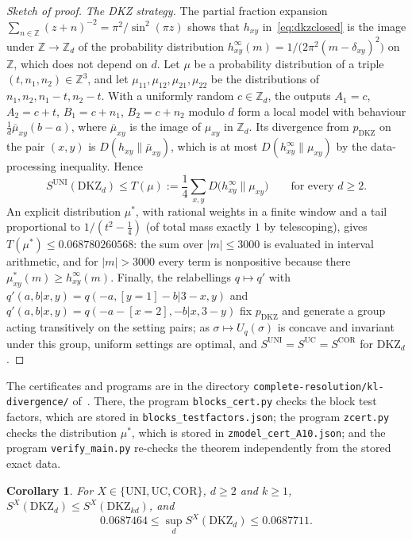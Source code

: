 \documentclass[11pt]{amsart}
\newtheorem{corollary}[theorem]{Corollary}
\theoremstyle{definition}
\theoremstyle{remark}
\numberwithin{equation}{section}
\newcommand{\Z}{\mathbb{Z}}
\newcommand{\DKZ}{\mathrm{DKZ}}
\begin{document}
\begin{proof}[Sketch of proof]
\emph{The DKZ strategy.} The partial fraction expansion $\sum_{n\in\Z}(z+n)^{-2}=\pi^2/\sin^2(\pi z)$ shows that $h_{xy}$
in~\eqref{eq:dkzclosed} is the image under $\Z\to\Z_d$ of the probability distribution
$h^\infty_{xy}(m)=1/\bigl(2\pi^2(m-\delta_{xy})^2\bigr)$ on $\Z$, which does not depend on $d$. Let $\mu$ be a probability
distribution of a triple $(t,n_1,n_2)\in\Z^3$, and let $\mu_{11},\mu_{12},\mu_{21},\mu_{22}$ be the distributions of
$n_1,n_2,n_1-t,n_2-t$. With a uniformly random $c\in\Z_d$, the outputs $A_1=c$, $A_2=c+t$, $B_1=c+n_1$, $B_2=c+n_2$
modulo $d$ form a local model with behaviour $\frac1d\bar\mu_{xy}(b-a)$, where $\bar\mu_{xy}$ is the image of
$\mu_{xy}$ in $\Z_d$. Its divergence from $p_{\DKZ}$ on the pair $(x,y)$ is $D(h_{xy}\|\bar\mu_{xy})$, which is at most
$D(h^\infty_{xy}\|\mu_{xy})$ by the data-processing inequality. Hence
\[
S^{\mathrm{UNI}}(\DKZ_d)\le T(\mu):=\frac14\sum_{x,y}D\bigl(h^\infty_{xy}\big\|\mu_{xy}\bigr)\qquad\text{for every }d\ge2.
\]
An explicit distribution $\mu^*$, with rational weights in a finite window and a tail proportional to $1/(t^2-\frac14)$
(of total mass exactly $1$ by telescoping), gives $T(\mu^*)\le0.068780260568$: the sum over $|m|\le3000$ is evaluated in
interval arithmetic, and for $|m|>3000$ every term is nonpositive because there $\mu^*_{xy}(m)\ge h^\infty_{xy}(m)$.
Finally, the relabellings $q\mapsto q'$ with $q'(a,b|x,y)=q(-a,[y=1]-b|3-x,y)$ and
$q'(a,b|x,y)=q(-a-[x=2],-b|x,3-y)$ fix $p_{\DKZ}$ and generate a group acting transitively on the setting pairs; as
$\sigma\mapsto U_q(\sigma)$ is concave and invariant under this group, uniform settings are optimal, and
$S^{\mathrm{UNI}}=S^{\mathrm{UC}}=S^{\mathrm{COR}}$ for $\DKZ_d$.
\end{proof}

The certificates and programs are in the directory \texttt{complete-resolution/kl-divergence/}
of~\cite{repo-oqp27}. There, the program \texttt{blocks\_cert.py} checks the block test factors, which are stored in
\texttt{blocks\_testfactors.json}; the program \texttt{zcert.py} checks the distribution $\mu^*$, which is stored in
\texttt{zmodel\_cert\_A10.json}; and the program \texttt{verify\_main.py} re-checks the theorem independently from the
stored exact data.

\begin{corollary}\label{cor:klsup}
For $X\in\{\mathrm{UNI},\mathrm{UC},\mathrm{COR}\}$, $d\ge2$ and $k\ge1$, $S^X(\DKZ_d)\le S^X(\DKZ_{kd})$, and
\[
0.0687464\le\sup_dS^X(\DKZ_d)\le0.0687711 .
\]
\end{corollary}
\end{document}
